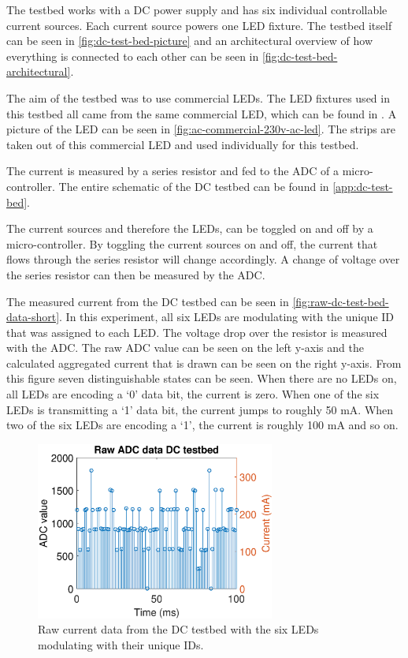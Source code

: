 	The testbed works with a DC power supply and has six individual controllable current sources.
	Each current source powers one LED fixture.
	The testbed itself can be seen in \autoref{fig:dc-test-bed-picture} and an architectural overview of how everything is connected to each other can be seen in \autoref{fig:dc-test-bed-architectural}.


	The aim of the testbed was to use commercial LEDs. 
	The LED fixtures used in this testbed all came from the same commercial LED, which can be found in \cite{commercial-230v-ac-led-aliexpress}.
	A picture of the LED can be seen in \autoref{fig:ac-commercial-230v-ac-led}.
	The strips are taken out of this commercial LED and used individually for this testbed.


	The current is measured by a series resistor and fed to the ADC of a micro-controller.
	The entire schematic of the DC testbed can be found in \autoref{app:dc-test-bed}. 

	The current sources and therefore the LEDs, can be toggled on and off by a micro-controller.
	By toggling the current sources on and off, the current that flows through the series resistor will change accordingly.
	A change of voltage over the series resistor can then be measured by the ADC.

	The measured current from the DC testbed can be seen in \autoref{fig:raw-dc-test-bed-data-short}.
	In this experiment, all six LEDs are modulating with the unique ID that was assigned to each LED.
	The voltage drop over the resistor is measured with the ADC.
	The raw ADC value can be seen on the left y-axis and the calculated aggregated current that is drawn can be seen on the right y-axis.
	From this figure seven distinguishable states can be seen.
	When there are no LEDs on, all LEDs are encoding a `0' data bit, the current is zero.
	When one of the six LEDs is transmitting a `1' data bit, the current jumps to roughly 50 mA.
	When two of the six LEDs are encoding a `1', the current is roughly 100 mA and so on.


	\begin{figure}
		\centering
		\includegraphics[angle=0,width=0.7\textwidth,keepaspectratio]{chapters/hardware-chapters/DC/dc-test-bed/dc-test-bed-raw-data.eps}
		\caption{Raw current data from the DC testbed with the six LEDs modulating with their unique IDs.}
		\label{fig:raw-dc-test-bed-data-short}
	\end{figure}



